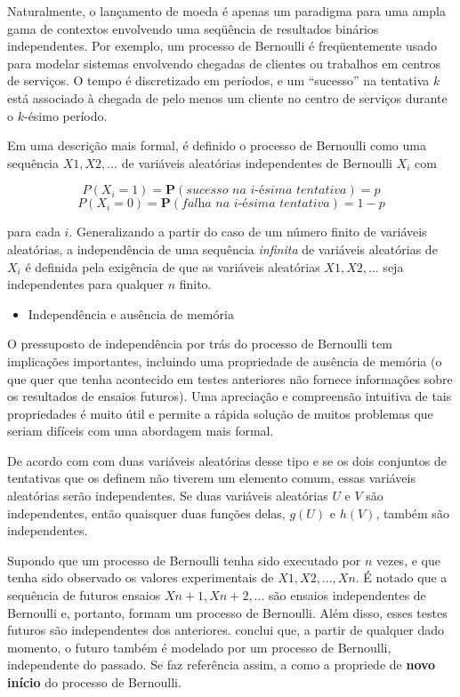 Naturalmente, o lançamento de moeda é apenas um paradigma para uma ampla gama de contextos envolvendo uma seqüência de resultados binários independentes. Por exemplo, um processo de Bernoulli é freqüentemente usado para modelar sistemas envolvendo chegadas de clientes ou trabalhos em centros de serviços. O tempo é discretizado em períodos, e um “sucesso” na tentativa $k$ está associado à chegada de pelo menos um cliente no centro de serviços durante o $k$-ésimo período.

Em uma descrição mais formal, é definido o processo de Bernoulli como uma sequência $X1, X2, \dots$ de variáveis aleatórias independentes de Bernoulli $X_{i}$ com

$$P(X_{i} = 1) = \textbf{P}(\textit{sucesso na i-ésima tentativa}) = p $$
$$P(X_{i} = 0) = \textbf{P}(\textit{falha na i-ésima tentativa}) = 1-p $$


para cada $i$. Generalizando a partir do caso de um número finito de variáveis aleatórias, a independência de uma sequência \textit{infinita} de variáveis aleatórias de $X_i$ é definida pela exigência de que as variáveis aleatórias $X1, X2, \dots$ seja independentes para qualquer $n$ finito.


\begin{itemize}
	\item Independência e ausência de memória
\end{itemize}

O pressuposto de independência por trás do processo de Bernoulli tem implicações importantes, incluindo uma propriedade de ausência de memória (o que quer que tenha acontecido em testes anteriores não fornece informações sobre os resultados de ensaios futuros). Uma apreciação e compreensão intuitiva de tais propriedades é muito útil e permite a rápida solução de muitos problemas que seriam difíceis com uma abordagem mais formal.

De acordo com \cite{bertsekas2008} com duas variáveis aleatórias desse tipo e se os dois conjuntos de tentativas que os definem não tiverem um elemento comum, essas variáveis aleatórias serão independentes. Se duas variáveis aleatórias $U$ e $V$ são independentes, então quaisquer duas funções delas, $g(U)$ e $h(V)$, também são independentes.

Supondo que um processo de Bernoulli tenha sido executado por $n$ vezes, e que tenha sido observado os valores experimentais de $X1, X2, ..., Xn$. É notado que a sequência de futuros ensaios $Xn + 1, Xn + 2, ...$ são ensaios independentes de Bernoulli e, portanto, formam um processo de Bernoulli. Além disso, esses testes futuros são independentes dos anteriores. \cite{bertsekas2008} conclui que, a partir de qualquer dado momento, o futuro também é modelado por um processo de Bernoulli, independente do passado. Se faz referência assim, a como a propriede de \textbf{novo início} do processo de Bernoulli.

